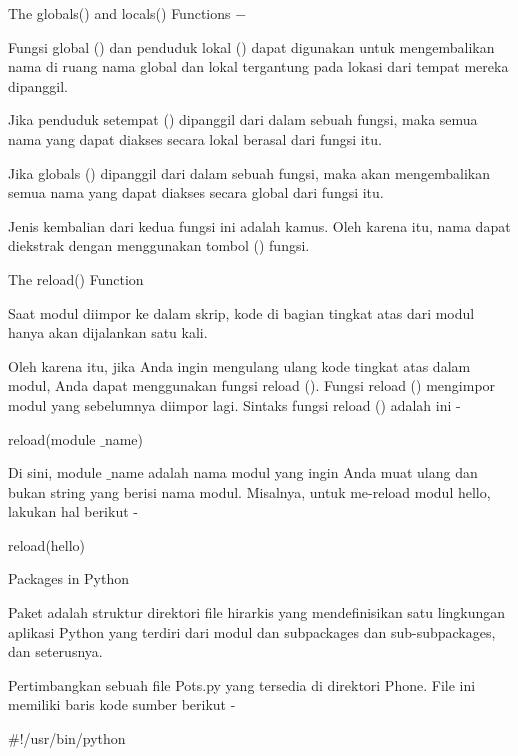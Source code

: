 \vspace{12pt}
\noindent 
The $  $globals() $  $and $  $locals() $  $Functions  $ - $ \par
\noindent 
Fungsi global () dan penduduk lokal () dapat digunakan untuk mengembalikan nama di ruang nama global dan lokal tergantung pada lokasi dari tempat mereka dipanggil. \par
\noindent 
Jika penduduk setempat () dipanggil dari dalam sebuah fungsi, maka semua nama yang dapat diakses secara lokal berasal dari fungsi itu. \par
\noindent 
Jika globals () dipanggil dari dalam sebuah fungsi, maka akan mengembalikan semua nama yang dapat diakses secara global dari fungsi itu. \par
\noindent 
Jenis kembalian dari kedua fungsi ini adalah kamus. Oleh karena itu, nama dapat diekstrak dengan menggunakan tombol () fungsi. \par
\vspace{12pt}
\noindent 
The $  $reload() $  $Function \par
\noindent 
Saat modul diimpor ke dalam skrip, kode di bagian tingkat atas dari modul hanya akan dijalankan satu kali. \par
\noindent 
Oleh karena itu, jika Anda ingin mengulang ulang kode tingkat atas dalam modul, Anda dapat menggunakan fungsi reload (). Fungsi reload () mengimpor modul yang sebelumnya diimpor lagi. Sintaks fungsi reload () adalah ini - \par
\noindent 
 \hspace*{0.5in} reload(module $  \_  $name) \par
\noindent 
Di sini, module $  \_  $name adalah nama modul yang ingin Anda muat ulang dan bukan string yang berisi nama modul. Misalnya, untuk me-reload modul hello, lakukan hal berikut - \par
\noindent 
 \hspace*{0.5in} reload(hello) \par
\vspace{12pt}
\noindent 
Packages in Python \par
\noindent 
Paket adalah struktur direktori file hirarkis yang mendefinisikan satu lingkungan aplikasi Python yang terdiri dari modul dan subpackages dan sub-subpackages, dan seterusnya. \par
\noindent 
Pertimbangkan sebuah file Pots.py yang tersedia di direktori Phone. File ini memiliki baris kode sumber berikut - \par
\noindent 
 \hspace*{0.5in}  $  \#  $!/usr/bin/python \par
